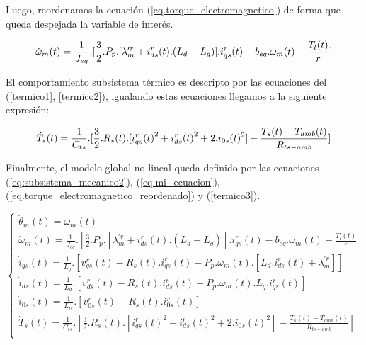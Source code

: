 \documentclass{article}
\begin{document}
Luego, reordenamos la ecuación (\ref{eq.torque_electromagnetico}) de forma que queda despejada la variable de interés.

\begin{equation}\label{eq.torque_electromagnetico_reordenado}
    \dot{\omega}_{m}(t) = \frac{1}{J_{eq}}.[\frac{3}{2}.P_{p}.[\lambda_{m}^{\prime r}+i_{ds}^r(t).(L_{d}-L_{q})].i_{qs}^r(t) - b_{eq}.\omega_{m}(t) - \frac{T_{l}(t)}{r}]\\
\end{equation}

El comportamiento subsistema térmico es descripto por las ecuaciones del
\hyperref[termico1, termico2]{(\ref*{termico1}, \ref*{termico2})}, igualando estas ecuaciones 
llegamos a la siguiente expresión:

\begin{equation}\label{termico3}
    \dot{T}_{s}(t) = \frac{1}{C_{ts}}.[\frac{3}{2}.R_{s}(t).[{i_{qs}^r(t)}^2+{i_{ds}^r(t)}^2 + 2.i_{0s}(t)^2] - \frac{T_{s}(t)-T_{amb}(t)}{R_{ts-amb}}]\\
\end{equation}

Finalmente, el modelo global no lineal queda definido por las ecuaciones (\ref{eq:subsistema_mecanico2}),
(\ref{eq:mi_ecuacion}), (\ref{eq.torque_electromagnetico_reordenado}) y (\ref{termico3}).

\begin{equation}\label{eq.modelo_global}
    \begin{cases}
        \dot{\theta}_{m}(t) = \omega_{m}(t)\\
        \dot{\omega}_{m}(t) = \frac{1}{J_{eq}}.[\frac{3}{2}.P_{p}.[\lambda_{m}^{\prime r}+i_{ds}^r(t).(L_{d}-L_{q})].i_{qs}^r(t) - b_{eq}.\omega_{m}(t) - \frac{T_{l}(t)}{r}]\\
        \dot{i}_{qs}(t) = \frac{1}{L_{q}}.[v_{qs}^r(t) - R_{s}(t).i_{qs}^r(t) - P_{p}.\omega_{m}(t).[L_{d}.i_{ds}^r(t) + \lambda_{m}^{\prime r}]]  \\
        \dot{i}_{ds}(t) = \frac{1}{L_{d}}.[v_{ds}^r(t) - R_{s}(t).i_{ds}^r(t) + P_{p}.\omega_{m}(t).L_{q}.i_{qs}^r(t)]  \\
        \dot{i}_{0s}(t) = \frac{1}{L_{ls}}.[v_{0s}^r(t) - R_{s}(t).i_{0s}^r(t)]\\
        \dot{T}_{s}(t) = \frac{1}{C_{ts}}.[\frac{3}{2}.R_{s}(t).[{i_{qs}^r(t)}^2+{i_{ds}^r(t)}^2 + 2.i_{0s}(t)^2] - \frac{T_{s}(t)-T_{amb}(t)}{R_{ts-amb}}]\\
    \end{cases}
\end{equation}
\end{document}
